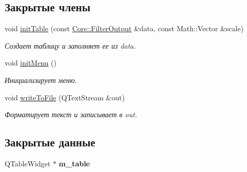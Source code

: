 \subsection*{Закрытые члены}
\begin{DoxyCompactItemize}
\item 
void \hyperlink{class_filter_results_table_a11f5f43cbe98060020a21574be83d37b}{init\+Table} (const \hyperlink{namespace_core_a60877581a235fc9566087b54d463ce9c}{Core\+::\+Filter\+Output} \&data, const Math\+::\+Vector \&scale)\hypertarget{class_filter_results_table_a11f5f43cbe98060020a21574be83d37b}{}\label{class_filter_results_table_a11f5f43cbe98060020a21574be83d37b}

\begin{DoxyCompactList}\small\item\em Создает таблицу и заполняет ее из data. \end{DoxyCompactList}\item 
void \hyperlink{class_filter_results_table_aeb9ac72c2a2ab2fd35e54a4b2cf3d191}{init\+Menu} ()\hypertarget{class_filter_results_table_aeb9ac72c2a2ab2fd35e54a4b2cf3d191}{}\label{class_filter_results_table_aeb9ac72c2a2ab2fd35e54a4b2cf3d191}

\begin{DoxyCompactList}\small\item\em Инициализирует меню. \end{DoxyCompactList}\item 
void \hyperlink{class_filter_results_table_aa7da6ec37e106e4ce6e9144bfe1c6b38}{write\+To\+File} (Q\+Text\+Stream \&out)\hypertarget{class_filter_results_table_aa7da6ec37e106e4ce6e9144bfe1c6b38}{}\label{class_filter_results_table_aa7da6ec37e106e4ce6e9144bfe1c6b38}

\begin{DoxyCompactList}\small\item\em Форматирует текст и записывает в out. \end{DoxyCompactList}\end{DoxyCompactItemize}
\subsection*{Закрытые данные}
\begin{DoxyCompactItemize}
\item 
Q\+Table\+Widget $\ast$ {\bfseries m\+\_\+table}\hypertarget{class_filter_results_table_a39dbd713c180f58b87f89f2a9102fa6c}{}\label{class_filter_results_table_a39dbd713c180f58b87f89f2a9102fa6c}

\end{DoxyCompactItemize}


